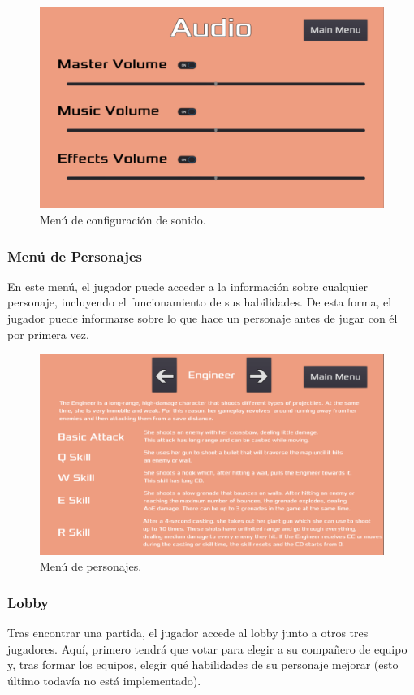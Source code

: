 \begin{figure}[h!]
	\centering
	\includegraphics[width=0.7\linewidth]{figures/AudioMenu}
	\caption{Menú de configuración de sonido.}
	\label{fig:AudioMenu2}
\end{figure}

\subsubsection{Menú de Personajes}
En este menú, el jugador puede acceder a la información sobre cualquier personaje, incluyendo el funcionamiento de sus habilidades. De esta forma, el jugador puede informarse sobre lo que hace un personaje antes de jugar con él por primera vez.

\begin{figure}[h!]
	\centering
	\includegraphics[width=0.7\linewidth]{figures/CharacterMenu}
	\caption{Menú de personajes.}
	\label{fig:CharacterMenu}
\end{figure}


\subsubsection{Lobby}
Tras encontrar una partida, el jugador accede al lobby junto a otros tres jugadores. Aquí, primero tendrá que votar para elegir a su compañero de equipo y, tras formar los equipos, elegir qué habilidades de su personaje mejorar (esto último todavía no está implementado).

